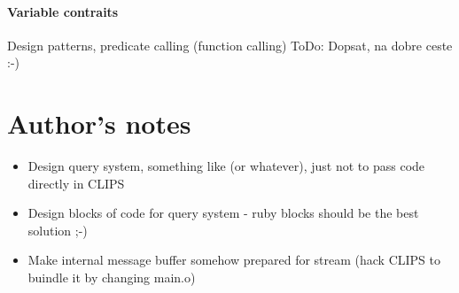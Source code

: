\documentclass[a4paper,10pt]{article}
\begin{document}
\paragraph{Variable contraits}
Design  patterns, predicate calling (function calling)
ToDo: Dopsat, na dobre ceste :-)

\section{Author's notes}
\begin{itemize}
 \item Design query system, something like (or whatever), just not to pass code directly in CLIPS
 \item Design blocks of code for query system - ruby blocks should be the best solution ;-)
 \item Make internal message buffer somehow prepared for stream (hack CLIPS to buindle it by changing main.o)
\end{itemize}
\end{document}

